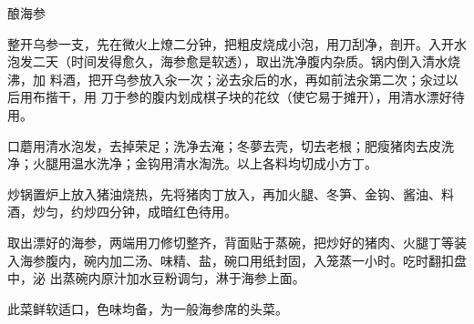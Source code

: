 %
%
%
%
%
%
%
\begin{recipe}[一品海参]{酿海参}

\ingredients


\preparation

\step 整开乌参一支，先在微火上燎二分钟，把粗皮烧成小泡，用刀刮净，剖开。入开水
泡发二天（时间发得愈久，海参愈是软透），取出洗净腹内杂质。锅内倒入清水烧沸，加
料酒，把开乌参放入汆一次；泌去汆后的水，再如前法汆第二次；汆过以后用布揩干，用
刀于参的腹内划成棋子块的花纹（使它易于摊开），用清水漂好待用。

\step 口蘑用清水泡发，去掉荣足；洗净去淹；冬夢去壳，切去老根；肥瘦猪肉去皮洗
净；火腿用温水洗净；金钩用清水淘洗。以上各料均切成小方丁。

\step 炒锅置炉上放入猪油烧热，先将猪肉丁放入，再加火腿、冬笋、金钩、酱油、料
酒，炒匀，约炒四分钟，成暗红色待用。

\step 取出漂好的海参，两端用刀修切整齐，背面贴于蒸碗，把炒好的猪肉、火腿丁等装
入海参腹内，碗内加二汤、味精、盐，碗口用纸封固，入笼蒸一小时。吃时翻扣盘中，泌
出蒸碗内原汁加水豆粉调匀，淋于海参上面。

\features

此菜鲜软适口，色味均备，为一般海参席的头菜。

\end{recipe}

